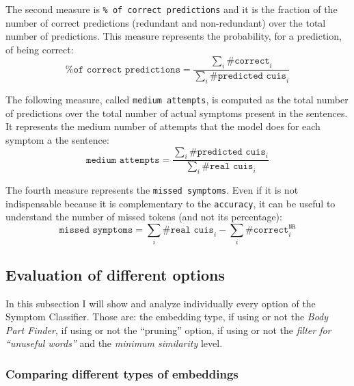 The second measure is \texttt{\% of correct predictions} and it is the fraction of the number of correct predictions (redundant and non-redundant) over the total number of predictions. This measure represents the probability, for a prediction, of being correct:
\begin{equation}
\texttt{\% of correct predictions} = \frac{\sum_{i}{\texttt{\#correct}_{i}}}{\sum_{i}{\texttt{\#predicted cuis}_{i}}}
\end{equation}

The following measure, called \texttt{medium attempts}, is computed as the total number of predictions over the total number of actual symptoms present in the sentences. It represents the medium number of attempts that the model does for each symptom a the sentence:
\begin{equation}
\texttt{medium attempts} = \frac{\sum_{i}{\texttt{\#predicted cuis}_{i}}}{\sum_{i}{\texttt{\#real cuis}_{i}}}
\end{equation}

The fourth measure represents the \texttt{missed symptoms}. Even if it is not indispensable because it is complementary to the \texttt{accuracy}, it can be useful to understand the number of missed tokens (and not its percentage):
\begin{equation}
\texttt{missed symptoms} = \sum_{i}{\texttt{\#real cuis}_{i}} - \sum_{i}{\texttt{\#correct}^{\texttt{NR}}_{i}}
\end{equation}

\subsection{Evaluation of different options}
In this subsection I will show and analyze individually every option of the Symptom Classifier. Those are: the embedding type, if using or not the \textit{Body Part Finder}, if using or not the ``pruning'' option, if using or not the \textit{filter for ``unuseful words''} and the \textit{minimum similarity} level.

\newpage
\subsubsection{Comparing different types of embeddings}


